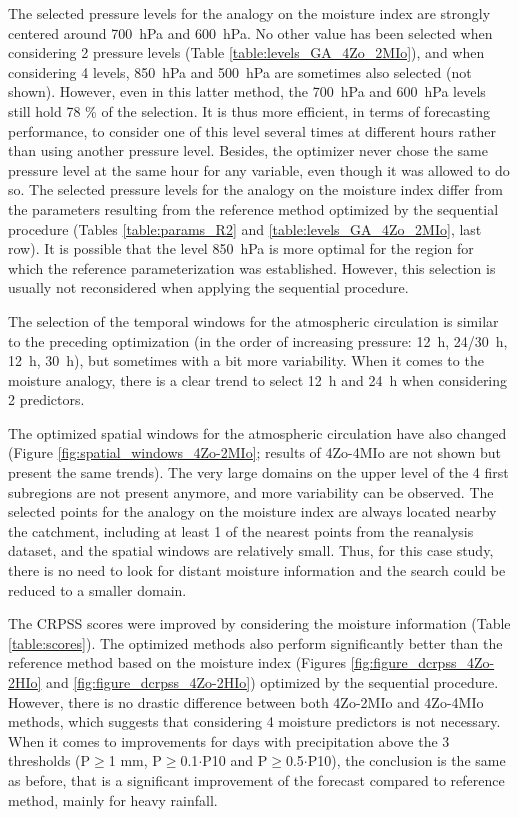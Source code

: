 \documentclass[review]{elsarticle}
\begin{document}
The selected pressure levels for the analogy on the moisture index are strongly centered around 700~hPa and 600~hPa. No other value has been selected when considering 2 pressure levels (Table \ref{table:levels_GA_4Zo_2MIo}), and when considering 4 levels, 850~hPa and 500~hPa are sometimes also selected (not shown). However, even in this latter method, the 700~hPa and 600~hPa levels still hold 78 \% of the selection. It is thus more efficient, in terms of forecasting performance, to consider one of this level several times at different hours rather than using another pressure level. Besides, the optimizer never chose the same pressure level at the same hour for any variable, even though it was allowed to do so. The selected pressure levels for the analogy on the moisture index differ from the parameters resulting from the reference method optimized by the sequential procedure (Tables \ref{table:params_R2} and \ref{table:levels_GA_4Zo_2MIo}, last row). It is possible that the level 850~hPa is more optimal for the region for which the reference parameterization was established. However, this selection is usually not reconsidered when applying the sequential procedure.

The selection of the temporal windows for the atmospheric circulation is similar to the preceding optimization (in the order of increasing pressure: 12~h, 24/30~h, 12~h, 30~h), but sometimes with a bit more variability. When it comes to the moisture analogy, there is a clear trend to select 12~h and 24~h when considering 2 predictors.

The optimized spatial windows for the atmospheric circulation have also changed (Figure \ref{fig:spatial_windows_4Zo-2MIo}; results of 4Zo-4MIo are not shown but present the same trends). The very large domains on the upper level of the 4 first subregions are not present anymore, and more variability can be observed. The selected points for the analogy on the moisture index are always located nearby the catchment, including at least 1 of the nearest points from the reanalysis dataset, and the spatial windows are relatively small. Thus, for this case study, there is no need to look for distant moisture information and the search could be reduced to a smaller domain. 

The CRPSS scores were improved by considering the moisture information (Table \ref{table:scores}). The optimized methods also perform significantly better than the reference method based on the moisture index (Figures \ref{fig:figure_dcrpss_4Zo-2HIo} and \ref{fig:figure_dcrpss_4Zo-2HIo}) optimized by the sequential procedure. However, there is no drastic difference between both 4Zo-2MIo and 4Zo-4MIo methods, which suggests that considering 4 moisture predictors is not necessary. When it comes to improvements for days with precipitation above the 3 thresholds (P\(\geq\)1 mm, P\(\geq\)0.1\(\cdot\)P10 and P\(\geq\)0.5\(\cdot\)P10), the conclusion is the same as before, that is a significant improvement of the forecast compared to reference method, mainly for heavy rainfall.
\end{document}
